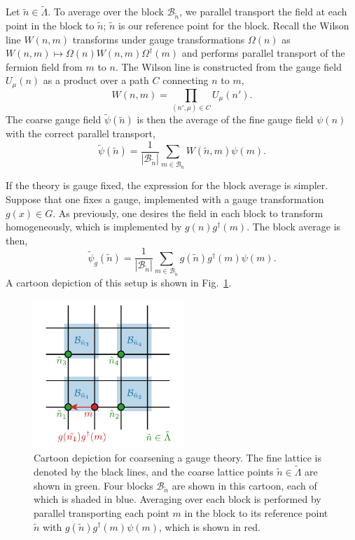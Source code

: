 \documentclass[letter,10pt]{report}
\begin{document}
Let $\tilde{n}\in\tilde{\Lambda}$. To average over the block $\mathcal B_{\tilde{n}}$, we parallel transport the field at each point in the block to $\tilde{n}$; $\tilde{n}$ is our reference point for the block. Recall the Wilson line $W(n, m)$ transforms under gauge transformations $\Omega(n)$ as $W(n, m)\mapsto \Omega(n) W(n, m) \Omega^\dagger(m)$ and performs parallel transport of the fermion field from $m$ to $n$. The Wilson line is constructed from the gauge field $U_\mu(n)$ as a product over a path $C$ connecting $n$ to $m$,
\begin{equation}
	W(n, m) = \prod_{(n', \mu)\in C} U_\mu(n').
\end{equation}
The coarse gauge field $\tilde{\psi}(\tilde{n})$ is then the average of the fine gauge field $\psi(n)$ with the correct parallel transport,
\begin{equation}
	\tilde{\psi}(\tilde{n}) = \frac{1}{ | \mathcal B_{\tilde{n}} | } \sum_{m\in \mathcal B_{\tilde{n}}} W (\tilde{n}, m) \psi(m).
\end{equation}

If the theory is gauge fixed, the expression for the block average is simpler. Suppose that one fixes a gauge, implemented with a gauge transformation $g(x)\in G$. As previously, one desires the field in each block to transform homogeneously, which is implemented by $g(n) g^\dagger(m)$. The block average is then,
\begin{equation}
	\tilde{\psi}_g(\tilde{n}) = \frac{1}{ | \mathcal B_{\tilde{n}} | } \sum_{m\in \mathcal B_{\tilde{n}}} g(\tilde{n}) g^\dagger(m) \psi(m).
\end{equation}
A cartoon depiction of this setup is shown in Fig.~\ref{fig:mg_coarsen_gt}.

\begin{figure}[!htp]
	\centering
	\includegraphics[width = 0.5\textwidth]{mg_averaging.pdf}
	\caption{Cartoon depiction for coarsening a gauge theory. The fine lattice is denoted by the black lines, and the coarse lattice points $\tilde{n}\in\tilde{\Lambda}$ are shown in green. Four blocks $\mathcal{B}_{\tilde{n}}$ are shown in this cartoon, each of which is shaded in blue. Averaging over each block is performed by parallel transporting each point $m$ in the block to its reference point $\tilde{n}$ with $g(\tilde{n}) g^\dagger(m) \psi(m)$, which is shown in red.}
	\label{fig:mg_coarsen_gt}
\end{figure}
\end{document}
